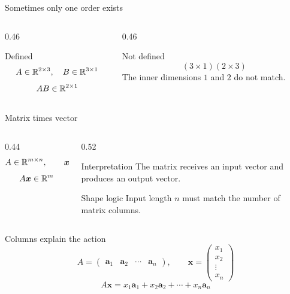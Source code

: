 \begin{frame}{Sometimes only one order exists}
  \begin{columns}[T,onlytextwidth]
    \begin{column}{0.46\textwidth}
      \begin{exampleblock}{Defined}
        \[
        A\in\mathbb{R}^{2\times3},\quad B\in\mathbb{R}^{3\times1}
        \]
        \[
        AB\in\mathbb{R}^{2\times1}
        \]
      \end{exampleblock}
    \end{column}
    \begin{column}{0.46\textwidth}
      \begin{alertblock}{Not defined}
        \[
        (3\times1)(2\times3)
        \]
        The inner dimensions $1$ and $2$ do not match.
      \end{alertblock}
    \end{column}
  \end{columns}
\end{frame}

\begin{frame}{Matrix times vector}
  \begin{columns}[T,onlytextwidth]
    \begin{column}{0.44\textwidth}
      \[
      A\in\mathbb{R}^{m\times n},\qquad \bm{x}\in\mathbb{R}^{n}
      \]
      \[
      A\bm{x}\in\mathbb{R}^{m}
      \]
    \end{column}
    \begin{column}{0.52\textwidth}
      \begin{block}{Interpretation}
        The matrix receives an input vector and produces an output vector.
      \end{block}
      \begin{exampleblock}{Shape logic}
        Input length $n$ must match the number of matrix columns.
      \end{exampleblock}
    \end{column}
  \end{columns}
\end{frame}

\begin{frame}{Columns explain the action}
  \Large
  \[
  A=\begin{pmatrix}\bm{a}_1&\bm{a}_2&\cdots&\bm{a}_n\end{pmatrix},
  \qquad
  \bm{x}=\begin{pmatrix}x_1\\x_2\\\vdots\\x_n\end{pmatrix}
  \]
  \[
  A\bm{x}=x_1\bm{a}_1+x_2\bm{a}_2+\cdots+x_n\bm{a}_n
  \]

  \vspace{0.5cm}
\end{frame}
